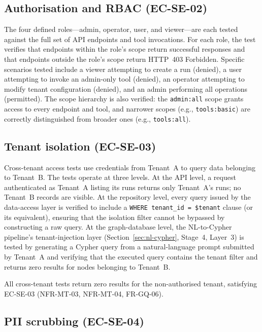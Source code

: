 \documentclass[a4paper]{sapthesis}
\begin{document}
\subsection{Authorisation and RBAC (EC-SE-02)}

The four defined roles---admin, operator, user, and viewer---are each
tested against the full set of API endpoints and tool invocations.  For
each role, the test verifies that endpoints within the role's scope
return successful responses and that endpoints outside the role's scope
return HTTP~403 Forbidden.  Specific scenarios tested include a viewer
attempting to create a run (denied), a user attempting to invoke an
admin-only tool (denied), an operator attempting to modify tenant
configuration (denied), and an admin performing all operations
(permitted).  The scope hierarchy is also verified: the
\texttt{admin:all} scope grants access to every endpoint and tool, and
narrower scopes (e.g., \texttt{tools:basic}) are correctly
distinguished from broader ones (e.g., \texttt{tools:all}).

\subsection{Tenant isolation (EC-SE-03)}

Cross-tenant access tests use credentials from Tenant~A to query data
belonging to Tenant~B.  The tests operate at three levels.  At the API
level, a request authenticated as Tenant~A listing its runs returns only
Tenant~A's runs; no Tenant~B records are visible.  At the repository
level, every query issued by the data-access layer is verified to
include a \texttt{WHERE tenant\_id = \$tenant} clause (or its
equivalent), ensuring that the isolation filter cannot be bypassed by
constructing a raw query.  At the graph-database level, the NL-to-Cypher
pipeline's tenant-injection layer (Section~\ref{sec:nl-cypher}, Stage~4,
Layer~3) is tested by generating a Cypher query from a natural-language
prompt submitted by Tenant~A and verifying that the executed query
contains the tenant filter and returns zero results for nodes belonging
to Tenant~B.

All cross-tenant tests return zero results for the non-authorised tenant,
satisfying EC-SE-03 (NFR-MT-03, NFR-MT-04, FR-GQ-06).

\subsection{PII scrubbing (EC-SE-04)}
\end{document}
